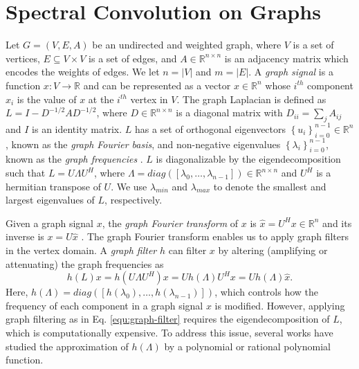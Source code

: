 \documentclass{article}
\begin{document}
 \section{Spectral Convolution on Graphs}
\label{sec:sepectral-filters}\vspace{-0.2cm}
Let $G = (V, E, A)$ be an undirected and weighted graph, where $V$ is a set of vertices, $E\subseteq V\times V$ is  a set of edges, and $A \in \mathbb{R}^{n\times n}$ is an adjacency matrix which encodes the weights of edges. We let $n=|V| $ and $m=|E|$. A \emph{graph signal} is a function $x: V\rightarrow \mathbb{R}$ and can be represented as a vector $x \in \mathbb{R}^{n}$ whose $i^{th}$ component $x_i$ is the value of $x$ at the $i^{th}$ vertex in $V$.  The graph Laplacian is defined as $L=I-D^{-1/2} AD^{-1/2}$, where $D \in \mathbb{R}^{n\times n}$ is a diagonal matrix with $D_{ii}=\sum_{j}A_{ij}$ and $I$ is an identity matrix. $L$ has a set of orthogonal eigenvectors $\left\{{u_i}\right\}_{i=0}^{n-1} \in \mathbb{R}^{n}$, known as the \emph{graph Fourier basis}, and non-negative eigenvalues $\left\{{\lambda_i}\right\}_{i=0}^{n-1}$, known as the \emph{graph frequencies} \cite{chung1997spectral}. 
$L$ is diagonalizable by the eigendecomposition such that $L=U\Lambda U^{H}$, where $\Lambda=diag\left(\left[\lambda_0,\dots,\lambda_{n-1}\right]\right) \in \mathbb{R}^{n\times n}$ and $U^H$ is a hermitian transpose of $U$. We use $\lambda_{min}$ and $\lambda_{max}$ to denote the smallest and largest eigenvalues of $L$, respectively.


Given a graph signal $x$, the \emph{graph Fourier transform} of $x$ is $\hat{x}=U^Hx \in \mathbb{R}^{n}$ and its inverse is $x=U\hat{x}$ \cite{sandryhaila2013discrete,shuman2013emerging}. The graph Fourier transform enables us to apply graph filters in the vertex domain. A \emph{graph filter} $h$ can filter $x$ by altering (amplifying or attenuating) the graph frequencies as 
\begin{equation} \label{equ:graph-filter}
h (L)x = h (U\Lambda U^H) x = U h (\Lambda) U^H x = U h (\Lambda) \hat{x}.
\end{equation}
Here, $h (\Lambda)=diag([h(\lambda_0), \dots, h (\lambda_{n-1})])$, which controls how the frequency of each component in a graph signal $x$ is modified. However, applying graph filtering as in Eq. \ref{equ:graph-filter} requires the eigendecomposition of $L$, which is computationally expensive. To address this issue, several works \cite{bianchi2019graph, defferrard2016convolutional,hammond2011wavelets,kipf2016semi,levie2017cayleynets,liao2019lanczosnet} have studied the approximation of $h(\Lambda)$ by a polynomial or rational polynomial function. 
\end{document}
